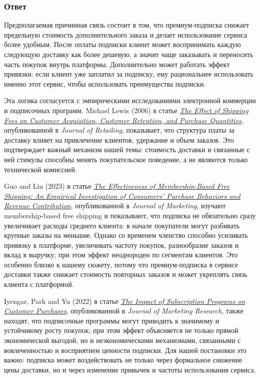 \documentclass[11pt]{article}
\begin{document}
\subsubsection{Ответ}\label{ux43eux442ux432ux435ux442-2}

Предполагаемая причинная связь состоит в том, что премиум-подписка
снижает предельную стоимость дополнительного заказа и делает
использование сервиса более удобным. После оплаты подписки клиент может
воспринимать каждую следующую доставку как более дешевую, а значит чаще
заказывать и переносить часть покупок внутрь платформы. Дополнительно
может работать эффект привязки: если клиент уже заплатил за подписку,
ему рациональнее использовать именно этот сервис, чтобы использовать
преимущества подписки.

Эта логика согласуется с эмпирическими исследованиями электронной
коммерции и подписочных программ. Michael Lewis (2006) в статье
\href{https://doi.org/10.102/j.jretai.2005.11.005}{\emph{The Effect of
Shipping Fees on Customer Acquisition, Customer Retention, and Purchase
Quantities}}, опубликованной в \emph{Journal of Retailing}, показывает,
что структура платы за доставку влияет на привлечение клиентов,
удержание и объем заказов. Это подтверждает важный механизм нашей темы:
стоимость доставки и связанные с ней стимулы способны менять
покупательское поведение, а не являются только технической комиссией.

Guo and Liu (2023) в статье
\href{https://doi.org/10.118/00222429231158116}{\emph{The Effectiveness
of Membership-Based Free Shipping: An Empirical Investigation of
Consumers' Purchase Behaviors and Revenue Contribution}}, опубликованной
в \emph{Journal of Marketing}, изучают membership-based free shipping и
показывают, что подписка не обязательно сразу увеличивает расходы
среднего клиента: в начале покупатели могут разбивать крупные заказы на
меньшие. Однако со временем членство способно усиливать привязку к
платформе, увеличивать частоту покупок, разнообразие заказов и вклад в
выручку; при этом эффект неоднороден по сегментам клиентов. Это особенно
близко к нашему сюжету, потому что премиум-подписка в сервисе доставки
также снижает стоимость повторных заказов и может укреплять связь
клиента с платформой.

Iyengar, Park and Yu (2022) в статье
\href{https://doi.org/10.118/00222437221080163}{\emph{The Impact of
Subscription Programs on Customer Purchases}}, опубликованной в
\emph{Journal of Marketing Research}, также находят, что подписочные
программы могут приводить к значимому и устойчивому росту покупок; при
этом эффект объясняется не только прямой экономической выгодой, но и
неэкономическими механизмами, связанными с вовлеченностью и восприятием
ценности подписки. Для нашей постановки это важно: подписка может
воздействовать не только через формальное снижение цены доставки, но и
через изменение привычек и частоты использования сервиса.
\end{document}
